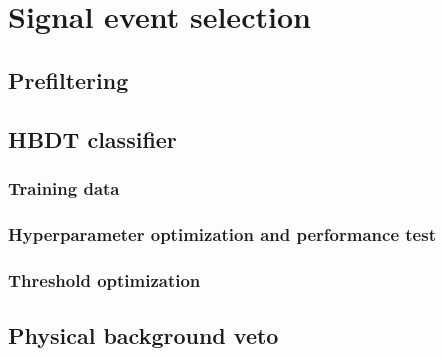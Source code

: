 \chapter{Signal event selection}
\label{cap:event_selection}

\section{Prefiltering}
\label{sec:prefilter}

\section{HBDT classifier}
\label{sec:HBDT}

\subsection{Training data}

\subsection{Hyperparameter optimization and performance test}

\subsection{Threshold optimization}

\section{Physical background veto}
\label{sec:B0_veto}